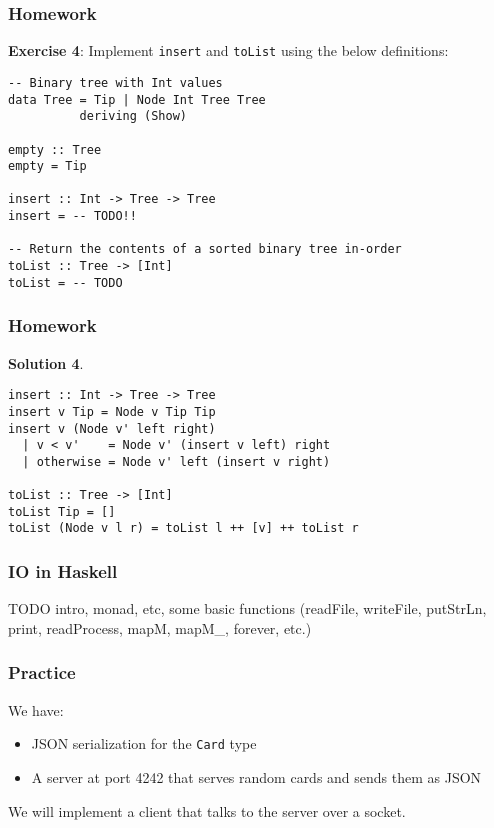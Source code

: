 \documentclass{beamer}
\begin{document}
\begin{frame}[fragile]
\frametitle{Homework}

\textbf{Exercise 4}: Implement \verb+insert+ and \verb+toList+ using the below definitions:

{\small
\begin{verbatim}
-- Binary tree with Int values
data Tree = Tip | Node Int Tree Tree
          deriving (Show)

empty :: Tree
empty = Tip

insert :: Int -> Tree -> Tree
insert = -- TODO!!

-- Return the contents of a sorted binary tree in-order
toList :: Tree -> [Int]
toList = -- TODO
\end{verbatim}
}
\end{frame}

\begin{frame}[fragile]
\frametitle{Homework}

\textbf{Solution 4}.

\bigskip

\begin{verbatim}
insert :: Int -> Tree -> Tree
insert v Tip = Node v Tip Tip
insert v (Node v' left right)
  | v < v'    = Node v' (insert v left) right
  | otherwise = Node v' left (insert v right)

toList :: Tree -> [Int]
toList Tip = []
toList (Node v l r) = toList l ++ [v] ++ toList r
\end{verbatim}

\end{frame}



\begin{frame}[fragile]
\frametitle{IO in Haskell}

TODO intro, monad, etc, some basic functions (readFile, writeFile,
putStrLn, print, readProcess, mapM, mapM\_, forever, etc.)

\end{frame}


\begin{frame}[fragile]
\frametitle{Practice}

We have:

\begin{itemize}
  \item JSON serialization for the \verb+Card+ type
  \item A server at port 4242 that serves random cards and sends them
    as JSON
\end{itemize}

We will implement a client that talks to the server over a socket.

\end{frame}
\end{document}

